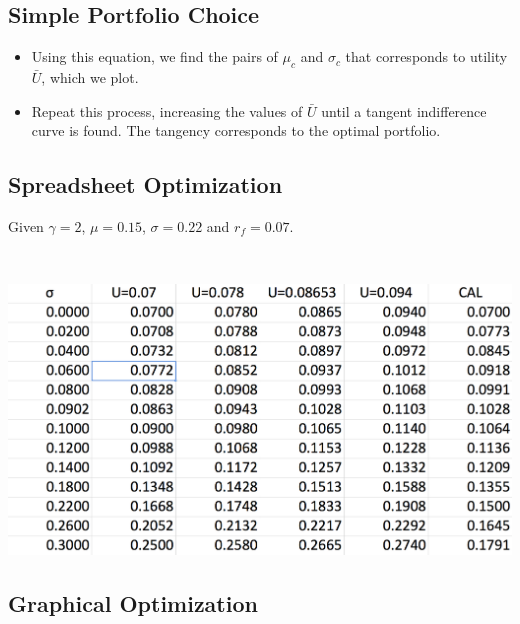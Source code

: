 \documentclass[letterpaper,10pt,english]{sphinxmanual}
\begin{document}
\subsection{Simple Portfolio Choice}
\label{allocation:id6}\begin{itemize}
\item {} 
Using this equation, we find the pairs of $\mu_c$ and
$\sigma_c$ that corresponds to utility $\bar{U}$, which we
plot.

\end{itemize}
\begin{itemize}
\item {} 
Repeat this process, increasing the values of $\bar{U}$ until a
tangent indifference curve is found. The tangency corresponds to
the optimal portfolio.

\end{itemize}


\subsection{Spreadsheet Optimization}
\label{allocation:spreadsheet-optimization}
Given $\gamma=2$, $\mu=0.15$, $\sigma=0.22$ and
$r_f=0.07$.

$\qquad$

\includegraphics[width=6in]{calSS.png}


\subsection{Graphical Optimization}
\label{allocation:graphical-optimization}
$\qquad$
\end{document}

